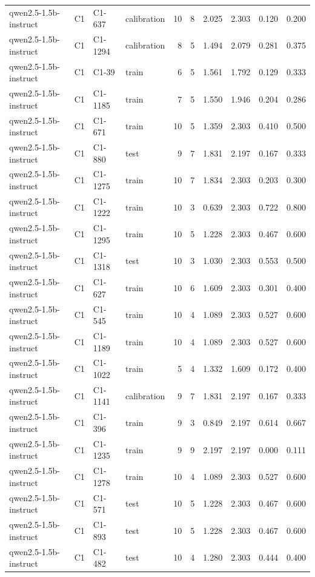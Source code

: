 \begin{table}
\begin{tabular}{llllrrrrrr}
qwen2.5-1.5b-instruct & C1 & C1-637 & calibration & 10 & 8 & 2.025 & 2.303 & 0.120 & 0.200 \\
qwen2.5-1.5b-instruct & C1 & C1-1294 & calibration & 8 & 5 & 1.494 & 2.079 & 0.281 & 0.375 \\
qwen2.5-1.5b-instruct & C1 & C1-39 & train & 6 & 5 & 1.561 & 1.792 & 0.129 & 0.333 \\
qwen2.5-1.5b-instruct & C1 & C1-1185 & train & 7 & 5 & 1.550 & 1.946 & 0.204 & 0.286 \\
qwen2.5-1.5b-instruct & C1 & C1-671 & train & 10 & 5 & 1.359 & 2.303 & 0.410 & 0.500 \\
qwen2.5-1.5b-instruct & C1 & C1-880 & test & 9 & 7 & 1.831 & 2.197 & 0.167 & 0.333 \\
qwen2.5-1.5b-instruct & C1 & C1-1275 & train & 10 & 7 & 1.834 & 2.303 & 0.203 & 0.300 \\
qwen2.5-1.5b-instruct & C1 & C1-1222 & train & 10 & 3 & 0.639 & 2.303 & 0.722 & 0.800 \\
qwen2.5-1.5b-instruct & C1 & C1-1295 & train & 10 & 5 & 1.228 & 2.303 & 0.467 & 0.600 \\
qwen2.5-1.5b-instruct & C1 & C1-1318 & test & 10 & 3 & 1.030 & 2.303 & 0.553 & 0.500 \\
qwen2.5-1.5b-instruct & C1 & C1-627 & train & 10 & 6 & 1.609 & 2.303 & 0.301 & 0.400 \\
qwen2.5-1.5b-instruct & C1 & C1-545 & train & 10 & 4 & 1.089 & 2.303 & 0.527 & 0.600 \\
qwen2.5-1.5b-instruct & C1 & C1-1189 & train & 10 & 4 & 1.089 & 2.303 & 0.527 & 0.600 \\
qwen2.5-1.5b-instruct & C1 & C1-1022 & train & 5 & 4 & 1.332 & 1.609 & 0.172 & 0.400 \\
qwen2.5-1.5b-instruct & C1 & C1-1141 & calibration & 9 & 7 & 1.831 & 2.197 & 0.167 & 0.333 \\
qwen2.5-1.5b-instruct & C1 & C1-396 & train & 9 & 3 & 0.849 & 2.197 & 0.614 & 0.667 \\
qwen2.5-1.5b-instruct & C1 & C1-1235 & train & 9 & 9 & 2.197 & 2.197 & 0.000 & 0.111 \\
qwen2.5-1.5b-instruct & C1 & C1-1278 & train & 10 & 4 & 1.089 & 2.303 & 0.527 & 0.600 \\
qwen2.5-1.5b-instruct & C1 & C1-571 & test & 10 & 5 & 1.228 & 2.303 & 0.467 & 0.600 \\
qwen2.5-1.5b-instruct & C1 & C1-893 & test & 10 & 5 & 1.228 & 2.303 & 0.467 & 0.600 \\
qwen2.5-1.5b-instruct & C1 & C1-482 & test & 10 & 4 & 1.280 & 2.303 & 0.444 & 0.400 \\

\end{tabular}
\end{table}
